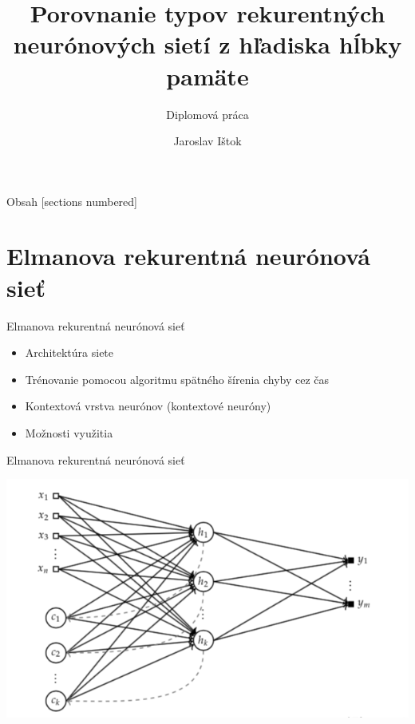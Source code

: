 \documentclass[10pt]{beamer}
\title{Porovnanie typov rekurentných neurónových sietí z hľadiska hĺbky pamäte}
\subtitle{Diplomová práca}
\date{}
\author{Jaroslav Ištok}
\begin{document}
\maketitle

\begin{frame}{Obsah}
  [sections numbered]
  \tableofcontents[hideallsubsections]
\end{frame}


\section{Elmanova rekurentná neurónová sieť}

\begin{frame}[fragile]{Elmanova rekurentná neurónová sieť}
\begin{itemize}
\item Architektúra siete 
\item Trénovanie pomocou algoritmu spätného šírenia chyby cez čas
\item Kontextová vrstva neurónov (kontextové neuróny)
\item Možnosti využitia 
\end{itemize}
\end{frame}

\begin{frame}[fragile]{Elmanova rekurentná neurónová sieť}

\includegraphics[width=\textwidth]{elman}

\end{frame}
\end{document}
